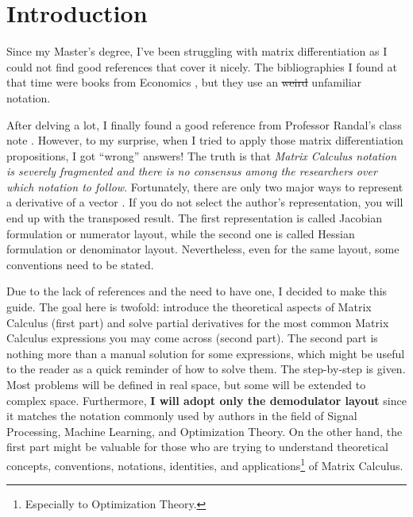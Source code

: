 \chapter{Introduction}
Since my Master's degree, I've been struggling with matrix differentiation as I could not find good references that cover it nicely. The bibliographies I found at that time were books from Economics \cite{dhrymes1978mathematics}, but they use an \st{weird} unfamiliar notation.

After delving a lot, I finally found a good reference from Professor Randal's class note \cite{barnes2006matrix}. However, to my surprise, when I tried to apply those matrix differentiation propositions, I got ``wrong'' answers! The truth is that \emph{Matrix Calculus notation is severely fragmented and there is no consensus among the researchers over which notation to follow}. Fortunately, there are only two major ways to represent a derivative of a vector \cite{Singh}. If you do not select the author's representation, you will end up with the transposed result. The first representation is called Jacobian formulation or numerator layout, while the second one is called Hessian formulation or denominator layout. Nevertheless, even for the same layout, some conventions need to be stated.

Due to the lack of references and the need to have one, I decided to make this guide. The goal here is twofold: introduce the theoretical aspects of Matrix Calculus (first part) and solve partial derivatives for the most common Matrix Calculus expressions you may come across (second part). The second part is nothing more than a manual solution for some expressions, which might be useful to the reader as a quick reminder of how to solve them. The step-by-step is given. Most problems will be defined in real space, but some will be extended to complex space. Furthermore, \textbf{I will adopt only the demodulator layout} since it matches the notation commonly used by authors in the field of Signal Processing, Machine Learning, and Optimization Theory. On the other hand, the first part might be valuable for those who are trying to understand theoretical concepts, conventions, notations, identities, and applications\footnote{Especially to Optimization Theory.} of Matrix Calculus.

